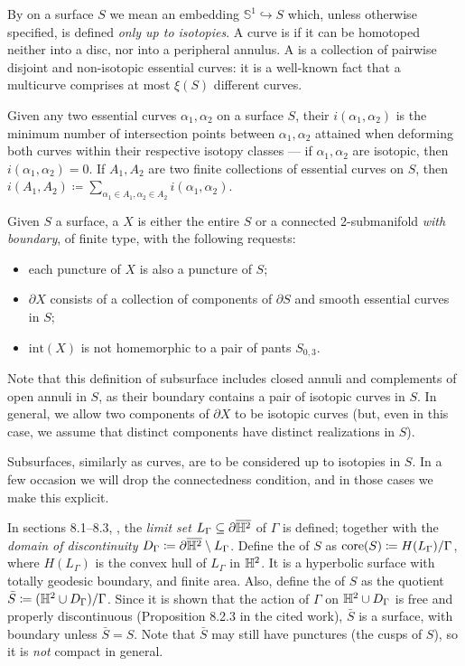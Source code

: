 By  on a surface $S$ we mean an embedding ${\mathbb S}^1\hookrightarrow S$ which, unless otherwise specified, is defined \emph{only up to isotopies}. A curve is  if it can be homotoped neither into a disc, nor into a peripheral annulus. A  is a collection of pairwise disjoint and non-isotopic essential curves: it is a well-known fact that a multicurve comprises at most $\xi(S)$ different curves.

Given any two essential curves $\alpha_1,\alpha_2$ on a surface $S$, their  $i(\alpha_1,\alpha_2)$ is the minimum number of intersection points between $\alpha_1,\alpha_2$ attained when deforming both curves within their respective isotopy classes --- if $\alpha_1,\alpha_2$ are isotopic, then $i(\alpha_1,\alpha_2)=0$. If $A_1,A_2$ are two finite collections of essential curves on $S$, then $i(A_1,A_2)\coloneqq \sum_{\alpha_1\in A_1,\alpha_2\in A_2} i (\alpha_1,\alpha_2)$.

Given $S$ a surface, a  $X$ is either the entire $S$ or a connected 2-submanifold \emph{with boundary}, of finite type, with the following requests:
\begin{itemize}
\item each puncture of $X$ is also a puncture of $S$;
\item $\partial X$ consists of a collection of components of $\partial S$ and smooth essential curves in $S$;
\item $\mathrm{int}(X)$ is not homemorphic to a pair of pants $S_{0,3}$.
\end{itemize}
Note that this definition of subsurface includes closed annuli and complements of open annuli in $S$, as their boundary contains a pair of isotopic curves in $S$. In general, we allow two components of $\partial X$ to be isotopic curves (but, even in this case, we assume that distinct components have distinct realizations in $S$).

Subsurfaces, similarly as curves, are to be considered up to isotopies in $S$. In a few occasion we will drop the connectedness condition, and in those cases we make this explicit.

In sections 8.1--8.3, \cite{thurstonnotes}, the \emph{limit set} $L_\Gamma\subseteq \partial\overline{\mathbb H^2}$ of $\Gamma$ is defined; together with the \emph{domain of discontinuity} $D_\Gamma\coloneqq \partial\overline{\mathbb H^2}\setminus L_\Gamma$. Define the  of $S$ as $\mathrm{core}(S)\coloneqq H(L_\Gamma)/\Gamma$, where $H(L_\Gamma)$ is the convex hull of $L_\Gamma$ in $\mathbb H^2$. It is a hyperbolic surface with totally geodesic boundary, and finite area. Also, define the  of $S$ as the quotient $\bar S\coloneqq (\mathbb H^2\cup D_\Gamma)/\Gamma$. Since it is shown that the action of $\Gamma$ on $\mathbb H^2\cup D_\Gamma$ is free and properly discontinuous (Proposition 8.2.3 in the cited work), $\bar S$ is a surface, with boundary unless $\bar S=S$. Note that $\bar S$ may still have punctures (the cusps of $S$), so it is \emph{not} compact in general.

